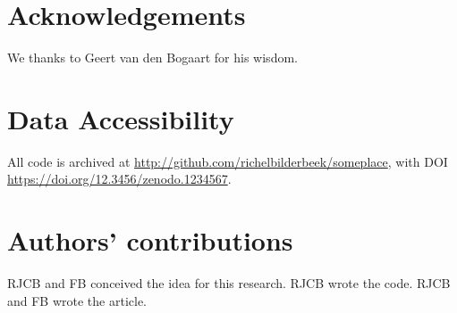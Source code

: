 \documentclass{article}
\newcommand{\richel}[1]{\textcolor{orange}{\textbf{[RB: #1]}}}
\begin{document}

\section{Acknowledgements}

We thanks to Geert van den Bogaart for his wisdom.

\section{Data Accessibility}

All code is archived at \url{http://github.com/richelbilderbeek/someplace},
with DOI \url{https://doi.org/12.3456/zenodo.1234567}.

\section{Authors' contributions}

RJCB and FB conceived the idea for this research. 
RJCB wrote the code.
RJCB and FB wrote the article.



\end{document}
